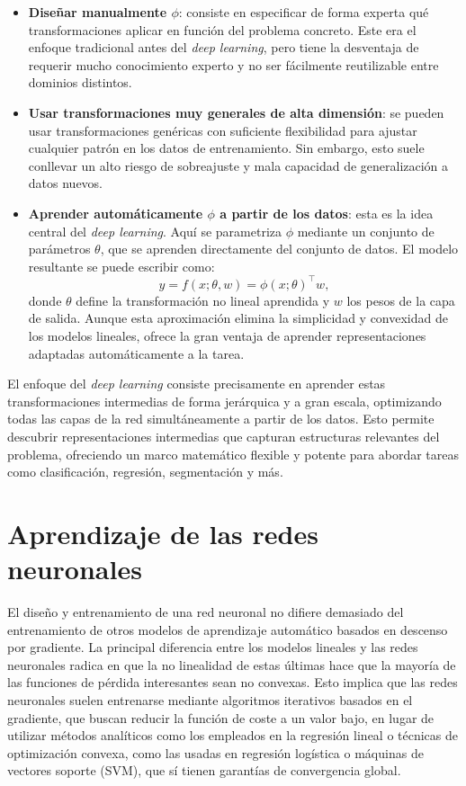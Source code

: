 \begin{itemize}
    \item \textbf{Diseñar manualmente \(\phi\)}: consiste en especificar de forma experta qué transformaciones aplicar en función del problema concreto. Este era el enfoque tradicional antes del \textit{deep learning}, pero tiene la desventaja de requerir mucho conocimiento experto y no ser fácilmente reutilizable entre dominios distintos.
    
    \item \textbf{Usar transformaciones muy generales de alta dimensión}: se pueden usar transformaciones genéricas con suficiente flexibilidad para ajustar cualquier patrón en los datos de entrenamiento. Sin embargo, esto suele conllevar un alto riesgo de sobreajuste y mala capacidad de generalización a datos nuevos.
    
    \item \textbf{Aprender automáticamente \(\phi\) a partir de los datos}: esta es la idea central del \textit{deep learning}. Aquí se parametriza \(\phi\) mediante un conjunto de parámetros \(\theta\), que se aprenden directamente del conjunto de datos. El modelo resultante se puede escribir como:
    \[
    y = f(x; \theta, w) = \phi(x; \theta)^\top w,
    \]
    donde \(\theta\) define la transformación no lineal aprendida y \(w\) los pesos de la capa de salida. Aunque esta aproximación elimina la simplicidad y convexidad de los modelos lineales, ofrece la gran ventaja de aprender representaciones adaptadas automáticamente a la tarea.
\end{itemize}

El enfoque del \textit{deep learning} consiste precisamente en aprender estas transformaciones intermedias de forma jerárquica y a gran escala, optimizando todas las capas de la red simultáneamente a partir de los datos. Esto permite descubrir representaciones intermedias que capturan estructuras relevantes del problema, ofreciendo un marco matemático flexible y potente para abordar tareas como clasificación, regresión, segmentación y más.

\section{Aprendizaje de las redes neuronales}
El diseño y entrenamiento de una red neuronal no difiere demasiado del entrenamiento de otros modelos de aprendizaje automático basados en descenso por gradiente. La principal diferencia entre los modelos lineales y las redes neuronales radica en que la no linealidad de estas últimas hace que la mayoría de las funciones de pérdida interesantes sean no convexas. Esto implica que las redes neuronales suelen entrenarse mediante algoritmos iterativos basados en el gradiente, que buscan reducir la función de coste a un valor bajo, en lugar de utilizar métodos analíticos como los empleados en la regresión lineal o técnicas de optimización convexa, como las usadas en regresión logística o máquinas de vectores soporte (SVM), que sí tienen garantías de convergencia global. 

